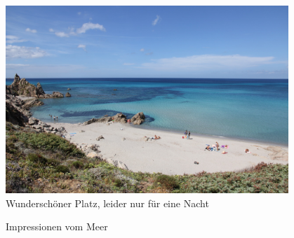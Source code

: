 \begin{figure}[hb]
    \centering
    \includegraphics[width=0.95\textwidth]{../Bilder/Sardinien/26.jpg}
    \caption{Wunderschöner Platz, leider nur für eine Nacht}
    \label{img:Sardinien2}
\end{figure}

\begin{figure}[H]
   \centering
   \quad
   \quad
   \quad
   \caption[Impressionen vom Mee]{Impressionen vom Meer}
\end{figure}

